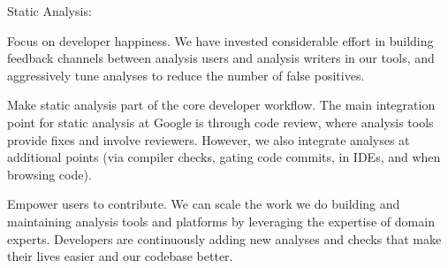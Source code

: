 Static Analysis:
\bit
\item Focus on developer happiness. We have invested considerable effort in building feedback channels between analysis
users and analysis writers in our tools, and aggressively tune analyses to reduce the number of false positives.
\item Make static analysis part of the core developer workflow. The main integration point for static analysis at Google
is through code review, where analysis tools provide fixes and involve reviewers. However, we also integrate analyses at
additional points (via compiler checks, gating code commits, in IDEs, and when browsing code).
\item Empower users to contribute. We can scale the work we do building and maintaining analysis tools and platforms by
leveraging the expertise of domain experts. Developers are continuously adding new analyses and checks that make their
lives easier and our codebase better.
\eit

